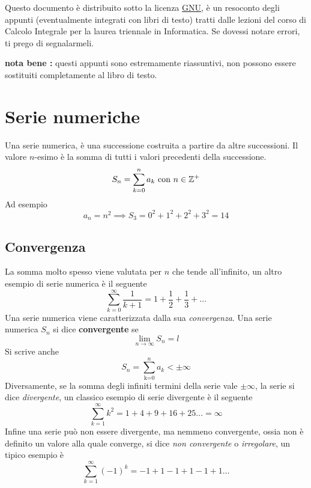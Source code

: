 \documentclass[10pt, letterpaper]{report}
\begin{document}
\newpage
\pagecolor{cartaRiciclata}%
Questo documento è distribuito sotto la licenza 
\color{blue}\href{https://www.gnu.org/licenses/fdl-1.3.txt}{GNU}\color{black},  
è un resoconto degli appunti (eventualmente integrati con libri di testo) tratti dalle lezioni del corso di Calcolo Integrale
\hphantom{a}per la laurea 
triennale in Informatica. Se dovessi notare errori, ti prego di segnalarmeli.



\textbf{nota bene :} questi appunti sono estremamente riassuntivi, non possono essere sostituiti 
completamente al libro di testo.
\newpage %
\normalsize
\tableofcontents 
\newpage

\fancyhf{}
\fancyhead[L]{\nouppercase{\leftmark}}
\fancyfoot[C]{\thepage}






\chapter{Serie numeriche}
 Una serie numerica, è una successione costruita a partire da altre successioni. Il valore 
$n$-esimo è la somma di tutti i valori precedenti della successione.
$$ S_n = \sum_{k=0}^n a_k\text{ con }n\in {\mathbb Z}^+$$ 
Ad esempio
$$ a_n=n^2\implies S_3 = 0^2+1^2+2^2+3^2=14$$
\section{Convergenza}
La somma molto spesso viene valutata per $n$ che tende all'infinito, un altro esempio di serie 
numerica è il seguente 
$$ \sum_{k=0}^\infty \dfrac{1}{k+1}=1+\frac{1}{2}+\frac{1}{3}+\dots$$
Una serie numerica viene caratterizzata dalla sua \textit{convergenza}.\acc 
{}Una serie numerica $S_n$ si dice \textbf{convergente} se 
$$ \lim_{n\rightarrow \infty} S_n = l$$
Si scrive anche 
$$S_n =\displaystyle \sum_\text{k=0}^n a_k < \pm\infty$$
Diversamente, se la somma degli infiniti termini della serie vale $\pm\infty$, 
la serie si dice \textit{divergente}, un classico esempio di serie divergente è il seguente 
$$ \sum_{k=1}^\infty k^2=1+4+9+16+25\dots = \infty$$
Infine una serie può non essere divergente, ma nemmeno convergente, ossia non è 
definito un valore alla quale converge, si dice \textit{non convergente} o 
\textit{irregolare}, un tipico esempio è 
$$ \sum_{k=1}^\infty (-1)^k=-1+1-1+1-1+1\dots $$
\end{document}
